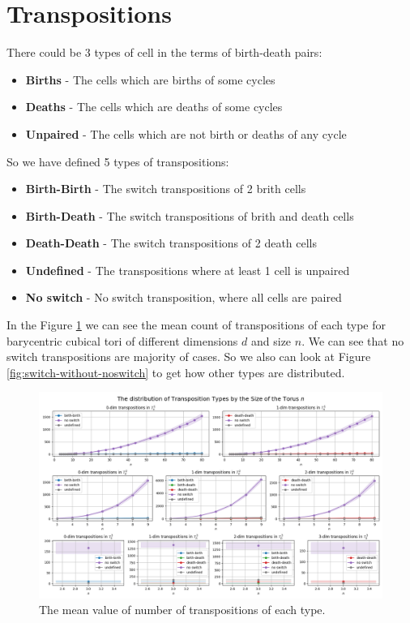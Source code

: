 \documentclass{article}
\begin{document}
\section{Transpositions}
\par There could be 3 types of cell in the terms of birth-death pairs:
\begin{itemize}
    \item \textbf{Births} - The cells which are births of some cycles
    \item \textbf{Deaths} - The cells which are deaths of some cycles
    \item \textbf{Unpaired} - The cells which are not birth or deaths of any cycle
\end{itemize}

\par So we have defined 5 types of transpositions:
\begin{itemize}
    \item \textbf{Birth-Birth} - The switch transpositions of 2 brith cells
    \item \textbf{Birth-Death} - The switch transpositions of brith and death cells
    \item \textbf{Death-Death} - The switch transpositions of 2 death cells
    \item \textbf{Undefined} - The transpositions where at least 1 cell is unpaired
    \item \textbf{No switch} - No switch transposition, where all cells are paired
\end{itemize}

\par In the Figure \ref{fig:switch-full} we can see the mean count of transpositions of each type for barycentric cubical tori of different dimensions $d$ and size $n$.
We can see that no switch transpositions are majority of cases. So we also can look at Figure \ref{fig:switch-without-noswitch} to get how other types are distributed.

\begin{figure}[h!]
    \hspace*{-3cm}
    \centering
    \includegraphics[width=1.5\textwidth]{pics/torus-transpositions/switch-types.png}
    \caption{The mean value of number of transpositions of each type.}
    \label{fig:switch-full}
\end{figure}
\end{document}

